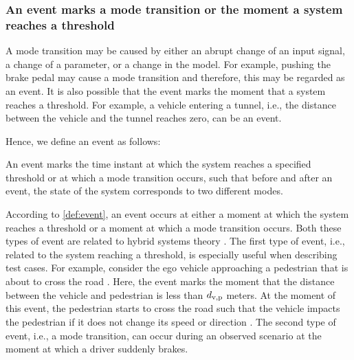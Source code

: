 \subsubsection{An event marks a mode transition or the moment a system reaches a threshold}
A mode transition may be caused by either an abrupt change of an input signal, a change of a parameter, or a change in the model. For example, pushing the brake pedal may cause a mode transition and therefore, this may be regarded as an event. It is also possible that the event marks the moment that a system reaches a threshold. For example, a vehicle entering a tunnel, i.e., the distance between the vehicle and the tunnel reaches zero, can be an event.


Hence, we define an event as follows:
\begin{definition}[Event] \label{def:event}
	An event marks the time instant at which the system reaches a specified threshold or at which a mode transition occurs, such that before and after an event, the state of the system corresponds to two different modes.
\end{definition}

According to \cref{def:event}, an event occurs at either a moment at which the system reaches a threshold or a moment at which a mode transition occurs. 
\cbstart
Both these types of event are related to hybrid systems theory \cite{deschutter2003hybrid, heemels2012eventcontrol}.
The first type of event, i.e., related to the system reaching a threshold, is especially useful when describing test cases. 
For example, consider the ego vehicle approaching a pedestrian that is about to cross the road \cite{seiniger2015test}. 
Here, the event marks the moment that the distance between the vehicle and pedestrian is less than $d_{\mathrm{v,p}}$ meters. 
At the moment of this event, the pedestrian starts to cross the road such that the vehicle impacts the pedestrian if it does not change its speed or direction \cite{seiniger2015test}.
The second type of event, i.e., a mode transition, can occur during an observed scenario at the moment at which a driver suddenly brakes. 

